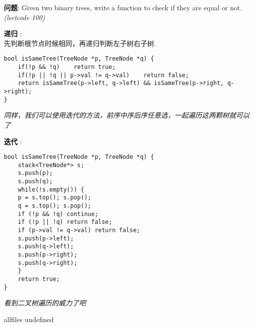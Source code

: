 \documentclass{article}
\begin{document}
\begin{CJK}{UTF8}{gbsn}     %

\else
    
\begin{description}
    \item{\textbf{问题}}: Given two binary trees, write a function to check if they are equal or not. \textit{(leetcode 100)}
    \item{\textbf{递归}} : 
    \\先判断根节点时候相同，再递归判断左子树右子树.
    \begin{lstlisting}
bool isSameTree(TreeNode *p, TreeNode *q) {
    if(!p && !q)    return true;
    if(!p || !q || p->val != q->val)    return false;
    return isSameTree(p->left, q->left) && isSameTree(p->right, q->right);
}
    \end{lstlisting}
    \textit{同样，我们可以使用迭代的方法，前序中序后序任意选，一起遍历这两颗树就可以了}
    \item{\textbf{迭代}} : 
    \begin{lstlisting}
bool isSameTree(TreeNode *p, TreeNode *q) {
    stack<TreeNode*> s;
    s.push(p);
    s.push(q);
    while(!s.empty()) {
    p = s.top(); s.pop();
    q = s.top(); s.pop();
    if (!p && !q) continue;
    if (!p || !q) return false;
    if (p->val != q->val) return false;
    s.push(p->left);
    s.push(q->left);
    s.push(p->right);
    s.push(q->right);
    }
    return true;
}
    \end{lstlisting}
    \textit{看到二叉树遍历的威力了吧}
\end{description}

\fi

\ifx allfiles undefined
\end{CJK}
\end{document}
